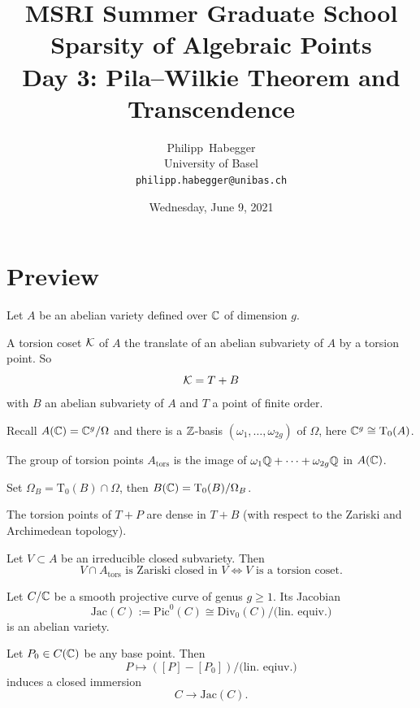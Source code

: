\documentclass{beamer}
\title{MSRI Summer Graduate School \\ Sparsity of Algebraic Points \\
  Day 3: Pila--Wilkie Theorem and Transcendence}
\author{Philipp~Habegger \\ University of Basel \\ \texttt{philipp.habegger@unibas.ch}}
\date{Wednesday, June 9, 2021}
\begin{document}
\setlength{\abovecaptionskip}{0pt} 
\setlength{\belowcaptionskip}{0pt} 

\renewcommand{\figurename}{Fig.}


\begin{frame}
  \titlepage
\end{frame}
\section{Preview}
\begin{frame}
  Let $A$ be an abelian variety defined over ${\mathbb{C}}$ of dimension $g$. 
  \begin{definition}
    A \alert{torsion coset} ${\mathcal K}$ of $A$
    the translate of an
    abelian subvariety of $A$ by a torsion point. So
    $$ {\mathcal K} = T+B $$
    with $B$ an abelian subvariety of $A$ and $T$ a point of finite order. 
  \end{definition}

  Recall $A({\mathbb{C}}) = {\mathbb{C}}^g / \Omega$ and there is a ${\mathbb{Z}}$-basis
  $(\omega_1,\ldots,\omega_{2g})$ of $\Omega$, here ${\mathbb{C}}^{g} \cong
  \mathrm{T}_0(A)$. 

  The group of torsion points $A_{\mathrm{tors}}$ is the image
  of $\omega_1{\mathbb{Q}}+\cdots+\omega_{2g}{\mathbb{Q}}$  in $A({\mathbb{C}})$.

  Set $\Omega_B = \mathrm{T}_0(B)\cap \Omega$, then $B({\mathbb{C}}) =
  \mathrm{T}_0(B) / \Omega_B$.

  The torsion points of $T+P$ are
  \alert{dense} in $T+B$ (with respect to the Zariski \alert{and}
  Archimedean topology).   
\end{frame}

\begin{frame}
  \begin{theorem}
    Let $V\subset A$ be an irreducible closed subvariety. Then
    \begin{equation*}
      V\cap A_{\mathrm{tors}} \text{ is Zariski closed in $V$}
      \Longleftrightarrow \text{$V$ is a torsion coset.}
    \end{equation*}
  \end{theorem}

  Let $C/{\mathbb{C}}$ be a smooth projective curve of genus $g\ge 1$. Its
  \alert{Jacobian}
  $$\mathrm{Jac}(C):=\mathrm{Pic}^0(C)\cong
  \mathrm{Div}_0(C)/\text{(lin. equiv.)}$$
  is an abelian variety.

  Let $P_0\in C({\mathbb{C}})$ be any base point. Then
  \begin{equation*}
    P\mapsto ([P]-[P_0])/\text{(lin. eqiuv.)} 
  \end{equation*}
  induces a closed immersion
  \begin{equation*}
    C\rightarrow \mathrm{Jac}(C).
  \end{equation*}
\end{frame}  
\end{document}
